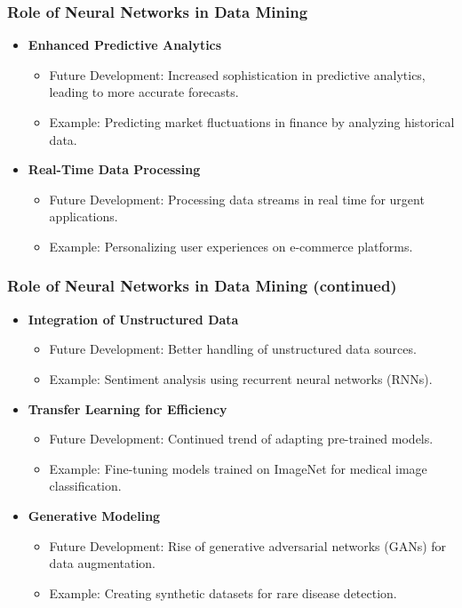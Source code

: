 \documentclass[aspectratio=169]{beamer}
\begin{document}
\begin{frame}[fragile]
    \frametitle{Role of Neural Networks in Data Mining}
    \begin{itemize}
        \item \textbf{Enhanced Predictive Analytics}
            \begin{itemize}
                \item Future Development: Increased sophistication in predictive analytics, leading to more accurate forecasts.
                \item Example: Predicting market fluctuations in finance by analyzing historical data.
            \end{itemize}
        \item \textbf{Real-Time Data Processing}
            \begin{itemize}
                \item Future Development: Processing data streams in real time for urgent applications.
                \item Example: Personalizing user experiences on e-commerce platforms.
            \end{itemize}
    \end{itemize}
\end{frame}

\begin{frame}[fragile]
    \frametitle{Role of Neural Networks in Data Mining (continued)}
    \begin{itemize}
        \item \textbf{Integration of Unstructured Data}
            \begin{itemize}
                \item Future Development: Better handling of unstructured data sources.
                \item Example: Sentiment analysis using recurrent neural networks (RNNs).
            \end{itemize}
        \item \textbf{Transfer Learning for Efficiency}
            \begin{itemize}
                \item Future Development: Continued trend of adapting pre-trained models.
                \item Example: Fine-tuning models trained on ImageNet for medical image classification.
            \end{itemize}
        \item \textbf{Generative Modeling}
            \begin{itemize}
                \item Future Development: Rise of generative adversarial networks (GANs) for data augmentation.
                \item Example: Creating synthetic datasets for rare disease detection.
            \end{itemize}
    \end{itemize}
\end{frame}
\end{document}
